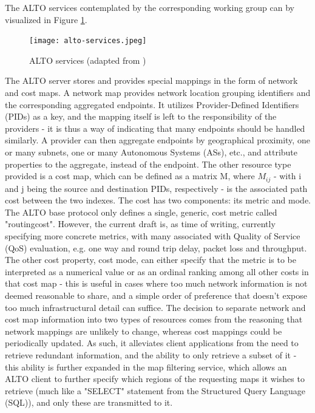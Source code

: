 \newpage

    The ALTO services contemplated by the corresponding working group can by visualized in Figure \ref{fig:alto-services}.

\begin{figure}[!h]
\centering
\texttt{[image: alto-services.jpeg]}
\caption{ALTO services (adapted from \cite{alto-protocol}) }
\label{fig:alto-services}
\end{figure}

    The ALTO server stores and provides special mappings in the form of network and cost maps.
    A network map provides network location grouping identifiers and the corresponding aggregated endpoints.
    It utilizes Provider-Defined Identifiers (PIDs) as a key, and the mapping itself is left to the responsibility of the providers - it is thus a way of indicating that many endpoints should be handled similarly.
    A provider can then aggregate endpoints by geographical proximity, one or many subnets, one or many Autonomous Systems (ASs), etc., and attribute properties to the aggregate, instead of the endpoint.
    The other resource type provided is a cost map, which can be defined as a matrix M, where $M_{ij}$ - with i and j being the source and destination PIDs, respectively - is the associated path cost between the two indexes.
    The cost has two components: its metric and mode.
    The ALTO base protocol only defines a single, generic, cost metric called "routingcost".
    However, the current draft \cite{alto-metrics} is, as time of writing, currently specifying more concrete metrics, with many associated with Quality of Service (QoS) evaluation, e.g. one way and round trip delay, packet loss and throughput.
    The other cost property, cost mode, can either specify that the metric is to be interpreted as a numerical value or as an ordinal ranking among all other costs in that cost map - this is useful in cases where too much network information is not deemed reasonable to share, and a simple order of preference that doesn't expose too much infrastructural detail can suffice.
    The decision to separate network and cost map information into two types of resources comes from the reasoning that network mappings are unlikely to change, whereas cost mappings could be periodically updated.
    As such, it alleviates client applications from the need to retrieve redundant information, and the ability to only retrieve a subset of it - this ability is further expanded in the map filtering service, which allows an ALTO client to further specify which regions of the requesting maps it wishes to retrieve (much like a "SELECT" statement from the Structured Query Language (SQL)), and only these are transmitted to it.

